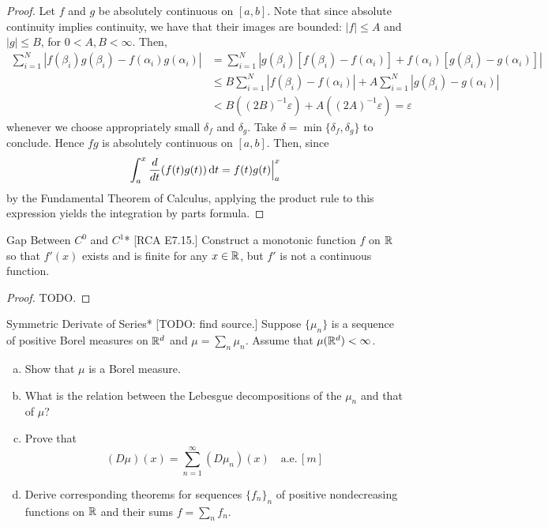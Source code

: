 \begin{proof}
    Let \(f\) and \(g\) be absolutely continuous on \([a, b]\). Note that since absolute continuity implies continuity, we have that their images are bounded: \(|f| \leq A\) and \(|g| \leq B\), for \(0 < A, B < \infty\). Then, 
    \begin{align*}
        \sum_{i=1}^N |f(\beta_i) g(\beta_i) - f(\alpha_i) g(\alpha_i)|
        &= \sum_{i=1}^N |g(\beta_i) [f(\beta_i) - f(\alpha_i)] + f(\alpha_i) [g(\beta_i) - g(\alpha_i)]| \\
        &\leq B \sum_{i=1}^N |f(\beta_i) - f(\alpha_i)| + A \sum_{i=1}^N |g(\beta_i) - g(\alpha_i)| \\
        &< B((2B)^{-1} \varepsilon) + A ((2A)^{-1} \varepsilon) 
        = \varepsilon
    \end{align*}
    whenever we choose appropriately small \(\delta_f\) and \(\delta_g\). Take \(\delta = \min\{\delta_f, \delta_g\}\) to conclude. Hence \(fg\) is absolutely continuous on \([a, b]\). Then, since
    \[
        \int_a^x \frac{d}{dt} (f(t) g(t)) \, \mathrm{d}t = f(t) g(t) \Big\rvert_a^x
    \]
    by the Fundamental Theorem of Calculus, applying the product rule to this expression yields the integration by parts formula. 
\end{proof}


\begin{problem}{Gap Between \(C^0\) and \(C^1\)}*
    [RCA E7.15.] Construct a monotonic function \(f\) on \(\mathbb{R}\) so that \(f'(x)\) exists and is finite for any \(x \in \mathbb{R}\), but \(f'\) is not a continuous function. 
\end{problem}

\begin{proof}
    TODO. 
\end{proof}


\begin{problem}{Symmetric Derivate of Series}*
    [TODO: find source.] Suppose \(\{\mu_n\}\) is a sequence of positive Borel measures on \(\mathbb{R}^d\) and \(\mu = \sum_n \mu_n\). Assume that \(\mu(\mathbb{R}^d) < \infty\). 
    \begin{enumerate}[(a)]
        \itemsep0em
        \item Show that \(\mu\) is a Borel measure.
        \item What is the relation between the Lebesgue decompositions of the \(\mu_n\) and that of \(\mu\)? 
        \item Prove that 
        \[
            (D\mu)(x) = \sum_{n=1}^\infty (D\mu_n)(x)
            \quad \text{a.e.}\, [m]
        \]
        \item Derive corresponding theorems for sequences \(\{f_n\}_n\) of positive nondecreasing functions on \(\mathbb{R}\) and their sums \(f = \sum_n f_n\). 
    \end{enumerate}
\end{problem}

